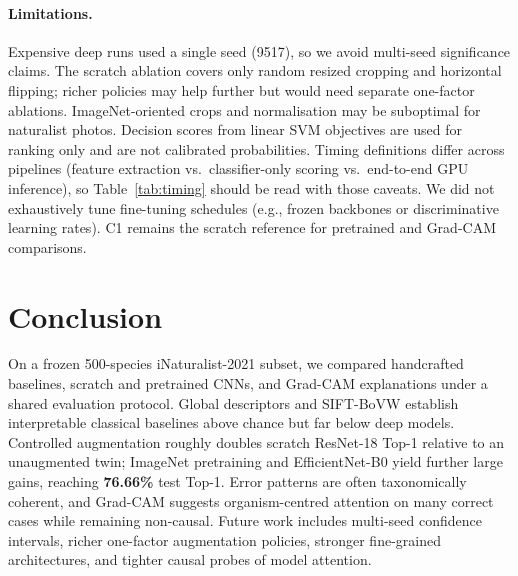 \documentclass[10pt,twocolumn,letterpaper]{article}
\begin{document}
\paragraph{Limitations.}
Expensive deep runs used a single seed (9517), so we avoid multi-seed
significance claims. The scratch ablation covers only random resized cropping
and horizontal flipping; richer policies may help further but would need
separate one-factor ablations. ImageNet-oriented crops and normalisation may
be suboptimal for naturalist photos. Decision scores from linear SVM
objectives are used for ranking only and are not calibrated probabilities.
Timing definitions differ across pipelines (feature extraction vs.\
classifier-only scoring vs.\ end-to-end GPU inference), so
Table~\ref{tab:timing} should be read with those caveats. We did not
exhaustively tune fine-tuning schedules (e.g., frozen backbones or
discriminative learning rates). C1 remains the scratch reference for
pretrained and Grad-CAM comparisons.

\section{Conclusion}

On a frozen 500-species iNaturalist-2021 subset, we compared handcrafted
baselines, scratch and pretrained CNNs, and Grad-CAM explanations under a
shared evaluation protocol. Global descriptors and SIFT-BoVW establish
interpretable classical baselines above chance but far below deep models.
Controlled augmentation roughly doubles scratch ResNet-18 Top-1 relative to an
unaugmented twin; ImageNet pretraining and EfficientNet-B0 yield further large
gains, reaching \textbf{76.66\%} test Top-1. Error patterns are often
taxonomically coherent, and Grad-CAM suggests organism-centred attention on
many correct cases while remaining non-causal. Future work includes multi-seed
confidence intervals, richer one-factor augmentation policies, stronger
fine-grained architectures, and tighter causal probes of model attention.

\FloatBarrier
\clearpage

{
\small


}
\end{document}
